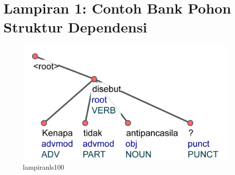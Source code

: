 \chapter*{Lampiran 1: Contoh Bank Pohon Struktur Dependensi}


\begin{figure}
	\centering \includegraphics[width=0.8
	\textwidth] {pics/lampiranls100.jpg} 
	\caption{lampiranls100} 
	\label{fig:lampiranls100} 
\end{figure}

